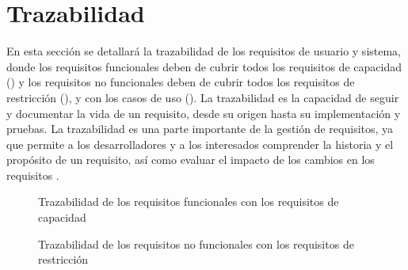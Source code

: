 \FloatBarrier

\section{Trazabilidad}\label{sec:trazabilidad}

En esta sección se detallará la trazabilidad de los requisitos de usuario y sistema, donde los requisitos funcionales deben de cubrir todos los requisitos de capacidad () y los requisitos no funcionales deben de cubrir todos los requisitos de restricción (), y con los casos de uso (). La trazabilidad es la capacidad de seguir y documentar la vida de un requisito, desde su origen hasta su implementación y pruebas. La trazabilidad es una parte importante de la gestión de requisitos, ya que permite a los desarrolladores y a los interesados comprender la historia y el propósito de un requisito, así como evaluar el impacto de los cambios en los requisitos \cite{IEEE-Requirements}.

\begin{figure}[htbp]
    \centering
    \traceabilityFNCA
    \caption{Trazabilidad de los requisitos funcionales con los requisitos de capacidad}
    \label{tab:trazabilidadFN-CA}
\end{figure}


\begin{figure}[htbp]
    \centering
    \traceabilityNFRE
    \caption{Trazabilidad de los requisitos no funcionales con los requisitos de restricción}
    \label{tab:trazabilidadNF-RE}
\end{figure}

